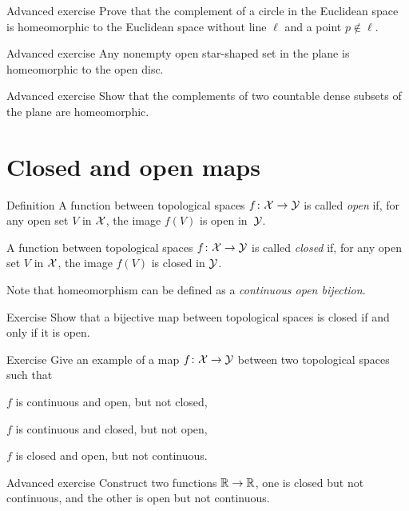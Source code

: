 \begin{thm}{Advanced exercise}
Prove that the complement of a circle in the Euclidean space is homeomorphic to the Euclidean space without line $\ell$ and a point $p\not\in\ell$.
\end{thm}

\begin{thm}{Advanced exercise}
Any nonempty open star-shaped set in the plane is homeomorphic to the open disc.
\end{thm}

\begin{thm}{Advanced exercise}
Show that the complements of two countable dense subsets of the plane are homeomorphic.
\end{thm}

\section{Closed and open maps}

\begin{thm}{Definition}\label{def:open-closed-maps}
A function between topological spaces 
$f\colon\mathcal{X}\to\mathcal{Y}$ is called \emph{open} if, for any open set $V$ in $\mathcal{X}$, the image $f(V)$ is open in~$\mathcal{Y}$.

A function between topological spaces 
$f\colon\mathcal{X}\to\mathcal{Y}$ is called \emph{closed} if, for any open set $V$ in $\mathcal{X}$, the image $f(V)$ is closed in $\mathcal{Y}$.
\end{thm}

Note that homeomorphism can be defined as a \emph{continuous open bijection}.

\begin{thm}{Exercise}
Show that a bijective map between topological spaces is closed if and only if it is open.
\end{thm}

\begin{thm}{Exercise}
Give an example of a map $f\colon\mathcal{X}\to\mathcal{Y}$ between two topological spaces such that 
\begin{subthm}{}
$f$ is continuous and open, but not closed,
\end{subthm}

\begin{subthm}{}
$f$ is continuous and closed, but not open,
\end{subthm}

\begin{subthm}{}
$f$ is closed and open, but not continuous.
\end{subthm}

\end{thm}

\begin{thm}{Advanced exercise}
Construct two functions $\mathbb{R}\to\mathbb{R}$, one is closed but not continuous, and the other is open but not continuous.
\end{thm}


